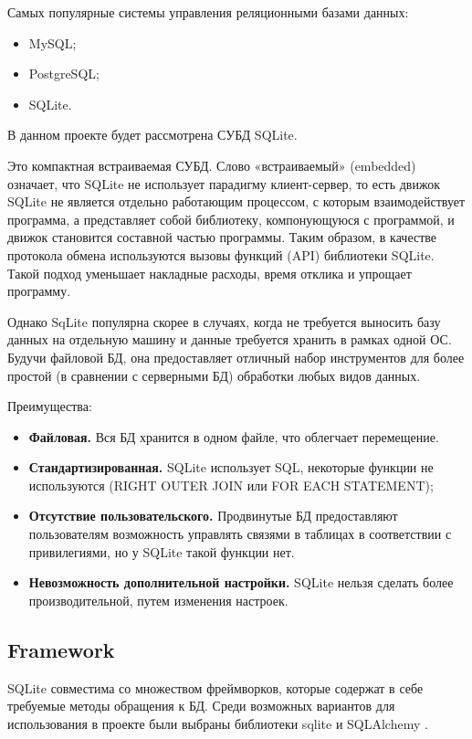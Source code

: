 \documentclass[12pt]{article}
\begin{document}
Самых популярные системы управления реляционными базами данных:
\begin{itemize}
	\item MySQL;
	\item PostgreSQL; 
	\item SQLite.
\end{itemize}

В данном проекте будет рассмотрена СУБД SQLite.

Это компактная встраиваемая СУБД. Слово «встраиваемый» (embedded) означает, что SQLite не использует парадигму клиент-сервер, то есть движок SQLite не является отдельно работающим процессом, с которым взаимодействует программа, а представляет собой библиотеку, компонующуюся с программой, и движок становится составной частью программы. Таким образом, в качестве протокола обмена используются вызовы функций (API) библиотеки SQLite. Такой подход уменьшает накладные расходы, время отклика и упрощает программу.

Однако SqLite популярна скорее в случаях, когда не требуется выносить базу данных на отдельную машину и данные требуется хранить в рамках одной ОС. Будучи файловой БД, она предоставляет отличный набор инструментов для более простой (в сравнении с серверными БД) обработки любых видов данных. \cite{1}

Преимущества:

\begin{itemize}
	\item {\bf Файловая.} Вся БД хранится в одном файле, что облегчает перемещение.
	\item {\bf Стандартизированная.} SQLite использует SQL, некоторые функции не используются (RIGHT OUTER JOIN или FOR EACH STATEMENT);
	\item {\bf Отсутствие пользовательского.} Продвинутые БД предоставляют пользователям возможность управлять связями в таблицах в соответствии с привилегиями, но у SQLite такой функции нет.
	\item {\bf Невозможность дополнительной настройки.} SQLite нельзя сделать более производительной, путем изменения настроек.
\end{itemize}

\subsection{Framework}%
\setcounter{subsection}{5}

SQLite совместима со множеством фреймворков, которые содержат в себе требуемые методы обращения к БД. Среди возможных вариантов для использования в проекте были выбраны библиотеки sqlite и SQLAlchemy \cite{2}.
\end{document}
